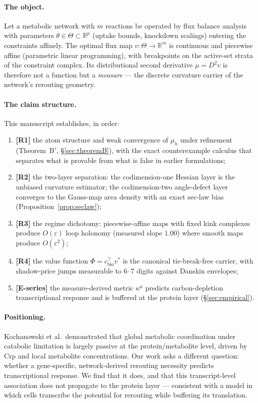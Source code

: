 \documentclass[11pt,a4paper]{article}
\theoremstyle{plain}
\theoremstyle{definition}
\theoremstyle{remark}
\newcommand{\kmu}{\kappa^{\mu}}
\newcommand{\RR}{\mathbb{R}}
\begin{document}
\paragraph{The object.}
Let a metabolic network with $m$ reactions be operated by flux balance
analysis with parameters $\theta \in \Theta \subset \RR^p$ (uptake bounds,
knockdown scalings) entering the constraints affinely. The optimal flux map
$v : \Theta \to \RR^m$ is continuous and piecewise affine (parametric
linear programming), with breakpoints on the active-set strata of the
constraint complex. Its distributional second derivative
$\mu = D^2 v$ is therefore not a function but a \emph{measure} --- the
discrete curvature carrier of the network's rerouting geometry.

\paragraph{The claim structure.}
This manuscript establishes, in order:
\begin{enumerate}[label=(\roman*)]
\item \textbf{[R1]} the atom structure and weak convergence of $\mu_h$
      under refinement (Theorem~B$'$, \S\ref{sec:theoremB}), with the
      exact counterexample calculus that separates what is provable from
      what is false in earlier formulations;
\item \textbf{[R2]} the two-layer separation: the codimension-one Hessian
      layer is the unbiased curvature estimator; the codimension-two
      angle-defect layer converges to the Gauss-map area density with an
      exact sec-law bias (Proposition~\ref{prop:seclaw});
\item \textbf{[R3]} the regime dichotomy: piecewise-affine maps with fixed
      kink complexes produce $O(\varepsilon)$ loop holonomy (measured slope
      $1.00$) where smooth maps produce $O(\varepsilon^2)$;
\item \textbf{[R4]} the value function $\Phi = c_{\mathrm{bio}}^\top v^*$
      is the canonical tie-break-free carrier, with shadow-price jumps
      measurable to $6$--$7$ digits against Danskin envelopes;
\item \textbf{[E-series]} the measure-derived metric $\kmu$ predicts
      carbon-depletion transcriptional response and is buffered at the
      protein layer (\S\ref{sec:empirical}).
\end{enumerate}

\paragraph{Positioning.}
Kochanowski et al.\ demonstrated that global metabolic coordination under
catabolic limitation is largely passive at the protein/metabolite level,
driven by Crp and local metabolite concentrations. Our work asks a
different question: whether a gene-specific, network-derived rerouting
necessity predicts transcriptional response. We find that it does, and that
this transcript-level association does not propagate to the protein layer
--- consistent with a model in which cells transcribe the potential for
rerouting while buffering its translation.
\end{document}
